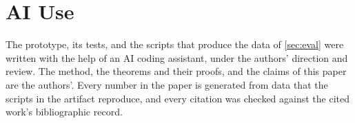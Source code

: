 \section*{AI Use}
The prototype, its tests, and the scripts that produce the data of \cref{sec:eval} were written with the help of an AI coding assistant, under the authors' direction and review.
The method, the theorems and their proofs, and the claims of this paper are the authors'.
Every number in the paper is generated from data that the scripts in the artifact reproduce, and every citation was checked against the cited work's bibliographic record.
